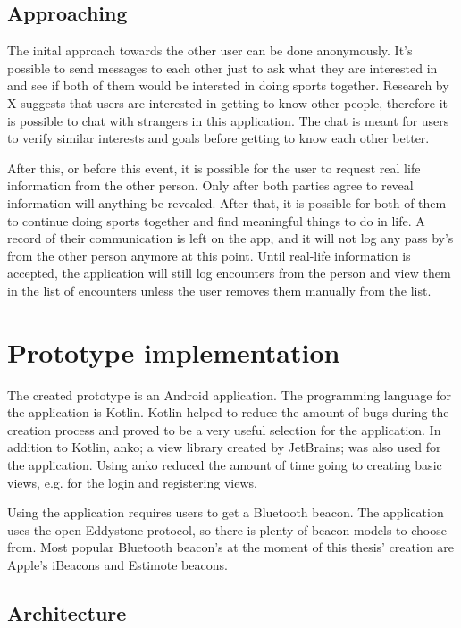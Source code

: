 \subsection{Approaching}

The inital approach towards the other user can be done anonymously. It's possible to send messages to each other just to ask what they are interested in and see if both of them would be intersted in doing sports together. Research by X suggests that users are interested in getting to know other people, therefore it is possible to chat with strangers in this application. The chat is meant for users to verify similar interests and goals before getting to know each other better.

After this, or before this event, it is possible for the user to request real life information from the other person. Only after both parties agree to reveal information will anything be revealed. After that, it is possible for both of them to continue doing sports together and find meaningful things to do in life. A record of their communication is left on the app, and it will not log any pass by's from the other person anymore at this point. Until real-life information is accepted, the application will still log encounters from the person and view them in the list of encounters unless the user removes them manually from the list.

\section{Prototype implementation}

The created prototype is an Android application. The programming language for the application is Kotlin. Kotlin helped to reduce the amount of bugs during the creation process and proved to be a very useful selection for the application. In addition to Kotlin, anko; a view library created by JetBrains; was also used for the application. Using anko reduced the amount of time going to creating basic views, e.g. for the login and registering views.

Using the application requires users to get a Bluetooth beacon. The application uses the open  Eddystone protocol, so there is plenty of beacon models to choose from. Most popular Bluetooth beacon's at the moment of this thesis' creation are Apple's iBeacons and Estimote beacons.

\subsection{Architecture}

